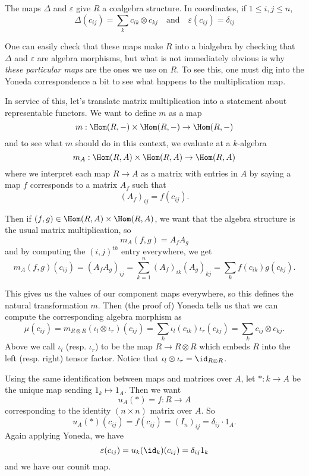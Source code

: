 \documentclass[12pt]{article}
\begin{document}
\begin{prop}
	The maps $\Delta$ and $\varepsilon$ give $R$ a coalgebra structure. In coordinates, if $1\le i,j\le n$,
	\[\Delta(c_{ij})=\sum_k c_{ik}\otimes c_{kj}\quad\text{and}\quad \varepsilon(c_{ij})=\delta_{ij}\]
\end{prop}
\begin{rmk}
	One can easily check that these maps make $R$ into a bialgebra by checking that $\Delta$ and $\varepsilon$ are algebra morphisms,
	but what is not immediately obvious is why \textit{these particular maps} are the ones we use on $R$. To 
	see this, one must dig into the Yoneda correspondence a bit to see what happens to the multiplication map.

	In service of this, let's translate matrix multiplication into a statement about representable functors. We want to define $m$ as a map 
	\[m:\Hom(R,-)\times\Hom(R,-)\to \Hom(R,-)\]
	and to see what $m$ should do in this context, we evaluate at a $k$-algebra 
	\[m_A:\Hom(R,A)\times\Hom(R,A)\to \Hom(R,A)\]
	where we interpret each map $R\to A$ as a matrix with entries in $A$ by saying a map $f$ corresponds to a matrix $A_f$ such that 
	\[(A_f)_{ij}=f(c_{ij}).\]

	Then if $(f,g)\in \Hom(R,A)\times\Hom(R,A)$, we want that the algebra structure is the usual matrix multiplication, so
	\[m_A(f,g)=A_fA_g\]
	and by computing the $(i,j)^{th}$ entry everywhere, we get 
	\[m_A(f,g)(c_{ij})=(A_fA_g)_{ij}=\sum_{k=1}^n(A_f)_{ik}(A_g)_{kj}=\sum_k f(c_{ik})g(c_{kj}).\]

	This gives us the values of our component maps everywhere, so this defines the natural transformation $m$. Then (the proof of)
	Yoneda tells us that we can compute the corresponding algebra morphism as 
	\[\mu(c_{ij})=m_{R\otimes R}(\iota_l\otimes\iota_r)(c_{ij})=\sum_k \iota_l(c_{ik})\iota_r(c_{kj})=\sum_k c_{ij}\otimes c_{kj}.\]
	Above we call $\iota_l$ (resp. $\iota_r$) to be the map $R\to R\otimes R$ which embeds $R$ into the left (resp. right) tensor factor. Notice 
	that $\iota_l\otimes\iota_r=\id_{R\otimes R}$.

	Using the same identification between maps and matrices over $A$, let $\ast:k\to A$ be the unique map sending $1_k\mapsto 1_A$. Then we want
	\[u_A(\ast)=f:R\to A\]
	corresponding to the identity $(n\times n)$ matrix over $A$. So 
	\[u_A(\ast)(c_{ij})=f(c_{ij})=(I_n)_{ij}=\delta_{ij}\cdot 1_A.\]
	Again applying Yoneda, we have 
	\[\varepsilon(c_{ij})=u_k(\id_k)(c_{ij})=\delta_{ij}1_k\]
	and we have our counit map.
\end{rmk}
\end{document}
